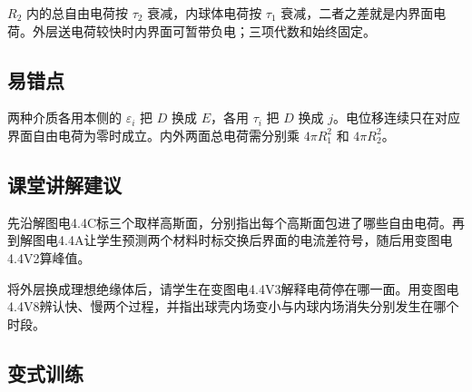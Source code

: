 \documentclass[UTF8,fontset=fandol,a4paper,11pt]{ctexart}
\begin{document}
$R_2$ 内的总自由电荷按 $\tau_2$ 衰减，内球体电荷按 $\tau_1$ 衰减，二者之差就是内界面电荷。外层送电荷较快时内界面可暂带负电；三项代数和始终固定。



\subsection*{易错点}

两种介质各用本侧的 $\varepsilon_i$ 把 $D$ 换成 $E$，各用 $\tau_i$ 把 $D$ 换成 $j$。电位移连续只在对应界面自由电荷为零时成立。内外两面总电荷需分别乘 $4\pi R_1^2$ 和 $4\pi R_2^2$。



\subsection*{课堂讲解建议}

先沿解图电4.4C标三个取样高斯面，分别指出每个高斯面包进了哪些自由电荷。再到解图电4.4A让学生预测两个材料时标交换后界面的电流差符号，随后用变图电4.4V2算峰值。

将外层换成理想绝缘体后，请学生在变图电4.4V3解释电荷停在哪一面。用变图电4.4V8辨认快、慢两个过程，并指出球壳内场变小与内球内场消失分别发生在哪个时段。


\subsection*{变式训练}
\end{document}
